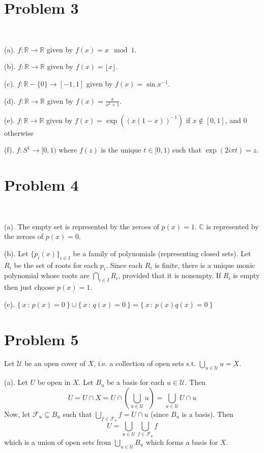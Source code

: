 \documentclass{article}
\begin{document}
\section{Problem 3}\,

(a). $f:\mathbb{R}\to\mathbb{R}$ given by $f(x)=x\mod1$.

(b). $f:\mathbb{R}\to\mathbb{R}$ given by $f(x)=\lfloor x\rfloor$.

(c). $f:\mathbb{R}-\{0\}\to[-1, 1]$ given by $f(x)=\sin x^{-1}$.

(d). $f:\mathbb{R}\to\mathbb{R}$ given by $f(x)=\frac{x}{x^2+1}$.

(e). $f: \mathbb{R}\to\mathbb{R}$ given by $f(x)=\exp((x(1-x))^{-1})$ if $x\notin[0,1]$, and $0$ otherwise

(f). $f:S^1\to[0,1)$ where $f(z)$ is the unique $t\in[0,1)$ such that $\exp(2i\pi t)=z$.

\section{Problem 4}\,

(a). The empty set is represented by the zeroes of $p(x)=1$. $\mathbb{C}$ is represented by the zeroes of $p(x)=0$.

(b). Let $\{p_i(x)\}_{i\in I}$ be a family of polynomials (representing closed sets). Let $R_i$ be the set of roots for each $p_i$.
Since each $R_i$ is finite, there is a unique monic polynomial whose roots are $\bigcap_{i\in I}R_i$, provided that it is nonempty.\newline
If $R_i$ is empty then just choose $p(x)=1$.

(c). $\{\ x\,:\,p(x)=0\ \}\cup\{\ x\,:\,q(x)=0\ \}=\{\ x\,:\,p(x)q(x)=0\ \}$

\section{Problem 5}

Let $\mathcal{U}$ be an open cover of $X$, i.e. a collection of open sets s.t. $\bigcup_{u\in\mathcal{U}}u=X$.

(a). Let $U$ be open in $X$. Let $B_u$ be a basis for each $u\in\mathcal{U}$. Then
$$U=U\cap X=U\cap(\bigcup_{u\in\mathcal{U}}u)=\bigcup_{u\in\mathcal{U}}U\cap u$$
Now, let $\mathcal{F}_u\subseteq B_u$ such that $\bigcup_{f\in\mathcal{F}_u}f=U\cap u$ (since $B_u$ is a basis). Then
$$U=\bigcup_{u\in\mathcal{U}}\bigcup_{f\in\mathcal{F}_u}f$$
which is a union of open sets from $\bigcup_{u\in\mathcal{U}} B_u$ which forms a basis for $X$.
\end{document}
